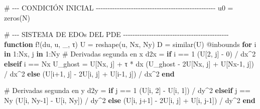 \documentclass[
  spanish,
  us-letterpaper,
  DIV=11,
  numbers=noendperiod]{scrreprt}
\newenvironment{Shaded}{\begin{snugshade}}{\end{snugshade}}
\newcommand{\CommentTok}[1]{\textcolor[rgb]{0.37,0.37,0.37}{#1}}
\newcommand{\ControlFlowTok}[1]{\textcolor[rgb]{0.00,0.23,0.31}{\textbf{#1}}}
\newcommand{\FloatTok}[1]{\textcolor[rgb]{0.68,0.00,0.00}{#1}}
\newcommand{\FunctionTok}[1]{\textcolor[rgb]{0.28,0.35,0.67}{#1}}
\newcommand{\KeywordTok}[1]{\textcolor[rgb]{0.00,0.23,0.31}{\textbf{#1}}}
\newcommand{\NormalTok}[1]{\textcolor[rgb]{0.00,0.23,0.31}{#1}}
\newcommand{\OperatorTok}[1]{\textcolor[rgb]{0.37,0.37,0.37}{#1}}
\newcommand{\PreprocessorTok}[1]{\textcolor[rgb]{0.68,0.00,0.00}{#1}}
\theoremstyle{plain}
\theoremstyle{definition}
\theoremstyle{remark}
\begin{document}
\begin{Shaded}
\begin{Highlighting}[]
\CommentTok{\# {-}{-}{-} CONDICIÓN INICIAL {-}{-}{-}{-}{-}{-}{-}{-}{-}{-}{-}{-}{-}{-}{-}{-}{-}{-}{-}{-}{-}{-}{-}{-}{-}{-}{-}{-}{-}{-}{-}{-}{-}{-}{-}{-}{-}{-}{-}{-}{-}{-}{-}{-}{-}{-}{-}{-}{-}{-}{-}}
\NormalTok{u0 }\OperatorTok{=} \FunctionTok{zeros}\NormalTok{(N)}

\CommentTok{\# {-}{-}{-} SISTEMA DE EDOs DEL PDE {-}{-}{-}{-}{-}{-}{-}{-}{-}{-}{-}{-}{-}{-}{-}{-}{-}{-}{-}{-}{-}{-}{-}{-}{-}{-}{-}{-}{-}{-}{-}{-}{-}{-}{-}{-}{-}{-}{-}{-}{-}{-}{-}{-}{-}}
\KeywordTok{function} \FunctionTok{f!}\NormalTok{(du, u, \_, τ)}
\NormalTok{    U }\OperatorTok{=} \FunctionTok{reshape}\NormalTok{(u, Nx, Ny)}
\NormalTok{    D }\OperatorTok{=} \FunctionTok{similar}\NormalTok{(U)}
    \PreprocessorTok{@inbounds} \ControlFlowTok{for}\NormalTok{ i }\KeywordTok{in} \FloatTok{1}\OperatorTok{:}\NormalTok{Nx, j }\KeywordTok{in} \FloatTok{1}\OperatorTok{:}\NormalTok{Ny}
        \CommentTok{\# Derivadas segunda en x}
\NormalTok{        d2x }\OperatorTok{=} \ControlFlowTok{if}\NormalTok{ i }\OperatorTok{==} \FloatTok{1}
\NormalTok{            (U[}\FloatTok{2}\NormalTok{, j] }\OperatorTok{{-}} \FloatTok{0}\NormalTok{) }\OperatorTok{/}\NormalTok{ dx}\OperatorTok{\^{}}\FloatTok{2}
        \ControlFlowTok{elseif}\NormalTok{ i }\OperatorTok{==}\NormalTok{ Nx}
\NormalTok{            U\_ghost }\OperatorTok{=}\NormalTok{ U[Nx, j] }\OperatorTok{+}\NormalTok{ τ }\OperatorTok{*}\NormalTok{ dx}
\NormalTok{            (U\_ghost }\OperatorTok{{-}} \FloatTok{2}\NormalTok{U[Nx, j] }\OperatorTok{+}\NormalTok{ U[Nx}\OperatorTok{{-}}\FloatTok{1}\NormalTok{, j]) }\OperatorTok{/}\NormalTok{ dx}\OperatorTok{\^{}}\FloatTok{2}
        \ControlFlowTok{else}
\NormalTok{            (U[i}\OperatorTok{+}\FloatTok{1}\NormalTok{, j] }\OperatorTok{{-}} \FloatTok{2}\NormalTok{U[i, j] }\OperatorTok{+}\NormalTok{ U[i}\OperatorTok{{-}}\FloatTok{1}\NormalTok{, j]) }\OperatorTok{/}\NormalTok{ dx}\OperatorTok{\^{}}\FloatTok{2}
        \ControlFlowTok{end}

        \CommentTok{\# Derivadas segunda en y}
\NormalTok{        d2y }\OperatorTok{=} \ControlFlowTok{if}\NormalTok{ j }\OperatorTok{==} \FloatTok{1}
\NormalTok{            (U[i, }\FloatTok{2}\NormalTok{] }\OperatorTok{{-}}\NormalTok{ U[i, }\FloatTok{1}\NormalTok{]) }\OperatorTok{/}\NormalTok{ dy}\OperatorTok{\^{}}\FloatTok{2}
        \ControlFlowTok{elseif}\NormalTok{ j }\OperatorTok{==}\NormalTok{ Ny}
\NormalTok{            (U[i, Ny}\OperatorTok{{-}}\FloatTok{1}\NormalTok{] }\OperatorTok{{-}}\NormalTok{ U[i, Ny]) }\OperatorTok{/}\NormalTok{ dy}\OperatorTok{\^{}}\FloatTok{2}
        \ControlFlowTok{else}
\NormalTok{            (U[i, j}\OperatorTok{+}\FloatTok{1}\NormalTok{] }\OperatorTok{{-}} \FloatTok{2}\NormalTok{U[i, j] }\OperatorTok{+}\NormalTok{ U[i, j}\OperatorTok{{-}}\FloatTok{1}\NormalTok{]) }\OperatorTok{/}\NormalTok{ dy}\OperatorTok{\^{}}\FloatTok{2}
        \ControlFlowTok{end}


\end{Highlighting}
\end{Shaded}
\end{document}
